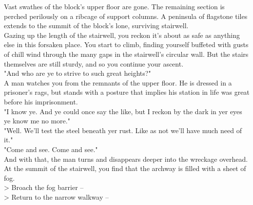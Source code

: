 Vast swathes of the block's upper floor are gone. The remaining section is perched perilously on a ribcage of support columns. A peninsula of flagstone tiles extends to the summit of the block's lone, surviving stairwell.\\

Gazing up the length of the stairwell, you reckon it's about as safe as anything else in this forsaken place. You start to climb, finding yourself buffeted with gusts of chill wind through the many gaps in the stairwell's circular wall. But the stairs themselves are still sturdy, and so you continue your ascent.\\

"And who are ye to strive to such great heights?"\\

A man watches you from the remnants of the upper floor. He is dressed in a prisoner's rags, but stands with a posture that implies his station in life was great before his imprisonment.\\

"I know ye. And ye could once say the like, but I reckon by the dark in yer eyes ye know me no more."\\

"Well. We'll test the steel beneath yer rust. Like as not we'll have much need of it."\\

"Come and see. Come and see."\\

And with that, the man turns and disappears deeper into the wreckage overhead. At the summit of the stairwell, you find that the archway is filled with a sheet of fog.\\

> Broach the fog barrier -- \\
> Return to the narrow walkway -- 